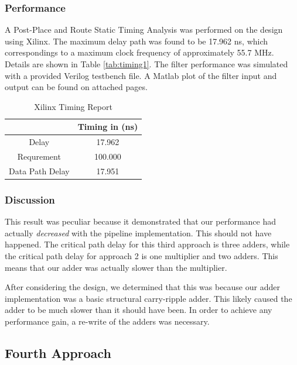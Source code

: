 \subsubsection*{Performance}
A Post-Place and Route Static Timing Analysis was performed on the design using Xilinx. The maximum delay path was found to be 17.962 ns, which correspondings to a maximum clock frequency of approximately 55.7 MHz. Details are shown in Table \ref{tab:timing1}. The filter performance was simulated with a provided Verilog testbench file. A Matlab plot of the filter input and output can be found on attached pages.

\begin{table}[h]
\caption{Xilinx Timing Report}
\begin{center}
\begin{tabular}{c|c}
           & Timing in (ns) \\
\hline
     Delay &  17.962   \\

Requrement &      100.000  \\

Data Path Delay &   17.951  \\
\end{tabular}  
\end{center}
\label{tab:timing3}
\end{table}

\subsubsection*{Discussion}
This result was peculiar because it demonstrated that our performance had actually \emph{decreased} with the pipeline implementation. This should not have happened. The critical path delay for this third approach is three adders, while the critical path delay for approach 2 is one multiplier and two adders. This means that our adder was actually slower than the multiplier.

After considering the design, we determined that this was because our adder implementation was a basic structural carry-ripple adder. This likely caused the adder to be much slower than it should have been. In order to achieve any performance gain, a re-write of the adders was necessary.


\subsection*{Fourth Approach}
